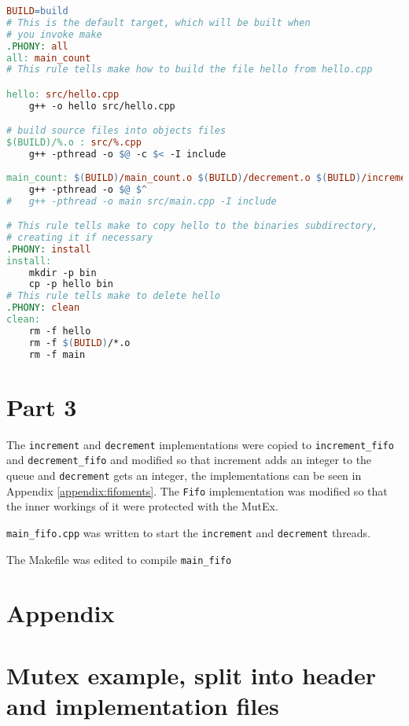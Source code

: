 \documentclass{article}
\begin{document}
\begin{lstlisting}[language=makefile, caption={Makefile for compiling Mutex example}]
BUILD=build
# This is the default target, which will be built when 
# you invoke make
.PHONY: all
all: main_count
# This rule tells make how to build the file hello from hello.cpp

hello: src/hello.cpp
	g++ -o hello src/hello.cpp

# build source files into objects files
$(BUILD)/%.o : src/%.cpp
	g++ -pthread -o $@ -c $< -I include
	
main_count: $(BUILD)/main_count.o $(BUILD)/decrement.o $(BUILD)/increment.o
	g++ -pthread -o $@ $^
#	g++ -pthread -o main src/main.cpp -I include

# This rule tells make to copy hello to the binaries subdirectory,
# creating it if necessary
.PHONY: install
install:
	mkdir -p bin
	cp -p hello bin
# This rule tells make to delete hello 
.PHONY: clean 
clean:
	rm -f hello
	rm -f $(BUILD)/*.o
	rm -f main

\end{lstlisting}

\section*{Part 3}
The \verb!increment! and \verb!decrement! implementations were copied to \verb!increment_fifo! and \verb!decrement_fifo! and modified so that increment adds an integer to the queue and \verb!decrement! gets an integer, the implementations can be seen in Appendix \ref{appendix:fifoments}. The \verb!Fifo! implementation was modified so that the inner workings of it were protected with the MutEx.

\verb!main_fifo.cpp! was written to start the \verb!increment! and \verb!decrement! threads. 


The Makefile was edited to compile \verb!main_fifo!

\section*{Appendix}
\appendix
\section{Mutex example, split into header and implementation files}\label{appendix:crements}





\end{document}
